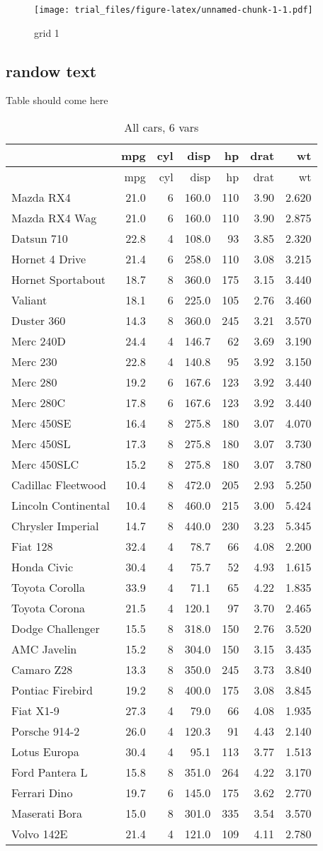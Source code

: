\documentclass[]{article}
\begin{document}
\begin{figure}[htbp]
\centering
\texttt{[image: trial\_files/figure-latex/unnamed-chunk-1-1.pdf]}
\caption{grid 1}
\end{figure}

\subsection{randow text}\label{randow-text-2}

\lipsum

Table should come here

\begin{longtable}[]{@{}lrrrrrr@{}}
\caption{All cars, 6 vars}\tabularnewline
\toprule
& mpg & cyl & disp & hp & drat & wt\tabularnewline
\midrule
\endfirsthead
\toprule
& mpg & cyl & disp & hp & drat & wt\tabularnewline
\midrule
\endhead
Mazda RX4 & 21.0 & 6 & 160.0 & 110 & 3.90 & 2.620\tabularnewline
Mazda RX4 Wag & 21.0 & 6 & 160.0 & 110 & 3.90 & 2.875\tabularnewline
Datsun 710 & 22.8 & 4 & 108.0 & 93 & 3.85 & 2.320\tabularnewline
Hornet 4 Drive & 21.4 & 6 & 258.0 & 110 & 3.08 & 3.215\tabularnewline
Hornet Sportabout & 18.7 & 8 & 360.0 & 175 & 3.15 & 3.440\tabularnewline
Valiant & 18.1 & 6 & 225.0 & 105 & 2.76 & 3.460\tabularnewline
Duster 360 & 14.3 & 8 & 360.0 & 245 & 3.21 & 3.570\tabularnewline
Merc 240D & 24.4 & 4 & 146.7 & 62 & 3.69 & 3.190\tabularnewline
Merc 230 & 22.8 & 4 & 140.8 & 95 & 3.92 & 3.150\tabularnewline
Merc 280 & 19.2 & 6 & 167.6 & 123 & 3.92 & 3.440\tabularnewline
Merc 280C & 17.8 & 6 & 167.6 & 123 & 3.92 & 3.440\tabularnewline
Merc 450SE & 16.4 & 8 & 275.8 & 180 & 3.07 & 4.070\tabularnewline
Merc 450SL & 17.3 & 8 & 275.8 & 180 & 3.07 & 3.730\tabularnewline
Merc 450SLC & 15.2 & 8 & 275.8 & 180 & 3.07 & 3.780\tabularnewline
Cadillac Fleetwood & 10.4 & 8 & 472.0 & 205 & 2.93 &
5.250\tabularnewline
Lincoln Continental & 10.4 & 8 & 460.0 & 215 & 3.00 &
5.424\tabularnewline
Chrysler Imperial & 14.7 & 8 & 440.0 & 230 & 3.23 & 5.345\tabularnewline
Fiat 128 & 32.4 & 4 & 78.7 & 66 & 4.08 & 2.200\tabularnewline
Honda Civic & 30.4 & 4 & 75.7 & 52 & 4.93 & 1.615\tabularnewline
Toyota Corolla & 33.9 & 4 & 71.1 & 65 & 4.22 & 1.835\tabularnewline
Toyota Corona & 21.5 & 4 & 120.1 & 97 & 3.70 & 2.465\tabularnewline
Dodge Challenger & 15.5 & 8 & 318.0 & 150 & 2.76 & 3.520\tabularnewline
AMC Javelin & 15.2 & 8 & 304.0 & 150 & 3.15 & 3.435\tabularnewline
Camaro Z28 & 13.3 & 8 & 350.0 & 245 & 3.73 & 3.840\tabularnewline
Pontiac Firebird & 19.2 & 8 & 400.0 & 175 & 3.08 & 3.845\tabularnewline
Fiat X1-9 & 27.3 & 4 & 79.0 & 66 & 4.08 & 1.935\tabularnewline
Porsche 914-2 & 26.0 & 4 & 120.3 & 91 & 4.43 & 2.140\tabularnewline
Lotus Europa & 30.4 & 4 & 95.1 & 113 & 3.77 & 1.513\tabularnewline
Ford Pantera L & 15.8 & 8 & 351.0 & 264 & 4.22 & 3.170\tabularnewline
Ferrari Dino & 19.7 & 6 & 145.0 & 175 & 3.62 & 2.770\tabularnewline
Maserati Bora & 15.0 & 8 & 301.0 & 335 & 3.54 & 3.570\tabularnewline
Volvo 142E & 21.4 & 4 & 121.0 & 109 & 4.11 & 2.780\tabularnewline
\bottomrule
\end{longtable}
\end{document}
